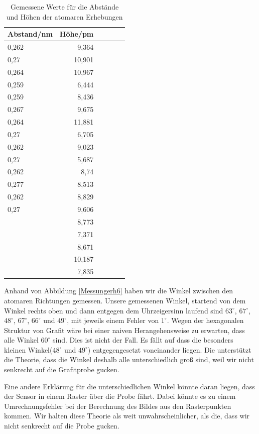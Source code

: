\documentclass[10pt,a4paper]{article}
\begin{document}
\begin{table}[h!]
	\centering
	\begin{tabular}{|l|r|c|lrp{16cm}}\hline
		Abstand/nm & Höhe/pm\\\hline
		0,262 & 9,364 \\
		0,27 & 10,901 \\
		0,264 & 10,967\\
		0,259& 6,444 \\
		0,259 & 8,436 \\
		0,267 & 9,675 \\
		0,264 & 11,881\\
		0,27 & 6,705\\
		0,262 & 9,023\\
		0,27 & 5,687\\
		0,262 & 8,74\\
		0,277 & 8,513\\
		0,262 & 8,829\\
		0,27 & 9,606\\
		& 8,773\\
		& 7,371\\
		& 8,671\\
		& 10,187\\
		& 7,835\\
		\hline
	\end{tabular}
	\caption{Gemessene Werte für die Abstände und Höhen der atomaren Erhebungen}
	\label{Messungerh5}
\end{table}

Anhand von Abbildung \ref{Messungerh6} haben wir die Winkel zwischen den atomaren Richtungen gemessen. Unsere gemessenen Winkel, startend von dem Winkel rechts oben und dann entgegen dem Uhrzeigersinn laufend sind $63^\circ$, $67^\circ$, $48^\circ$, $67^\circ$, $66^\circ$ und $49^\circ$, mit jeweils einem Fehler von $1^\circ$. Wegen der hexagonalen Struktur von Grafit wäre bei einer naiven Herangehensweise zu erwarten, dass alle Winkel $60^\circ$ sind. Dies ist nicht der Fall. Es fällt auf dass die besonders kleinen Winkel($48^\circ$ und $49^\circ$) entgegengesetzt voneinander liegen. Die unterstützt die Theorie, dass die Winkel deshalb alle unterschiedlich groß sind, weil wir nicht senkrecht auf die Grafitprobe gucken.

 Eine andere Erklärung für die unterschiedlichen Winkel könnte daran liegen, dass der Sensor in einem Raster über die Probe fährt. Dabei könnte es zu einem Umrechnungsfehler bei der Berechnung des Bildes aus den Rasterpunkten kommen. Wir halten diese Theorie als weit unwahrscheinlicher, als die, dass wir nicht senkrecht auf die Probe gucken.
 
\end{document}
